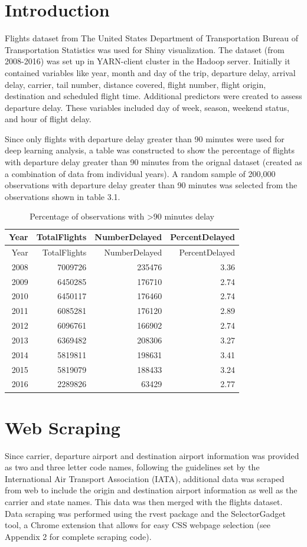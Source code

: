 \documentclass[12pt,twoside]{amherstthesis}
\begin{document}
  \section{Introduction}\label{introduction-1}
  
  Flights dataset from The United States Department of Transportation
  Bureau of Transportation Statistics was used for Shiny visualization.
  The dataset (from 2008-2016) was set up in YARN-client cluster in the
  Hadoop server. Initially it contained variables like year, month and day
  of the trip, departure delay, arrival delay, carrier, tail number,
  distance covered, flight number, flight origin, destination and
  scheduled flight time. Additional predictors were created to assess
  departure delay. These variables included day of week, season, weekend
  status, and hour of flight delay.
  
  Since only flights with departure delay greater than 90 minutes were
  used for deep learning analysis, a table was constructed to show the
  percentage of flights with departure delay greater than 90 minutes from
  the orignal dataset (created as a combination of data from individual
  years). A random sample of 200,000 observations with departure delay
  greater than 90 minutes was selected from the observations shown in
  table 3.1.
  
  \begin{longtable}[]{@{}rrrr@{}}
  \caption{Percentage of observations with \textgreater{}90 minutes
  delay}\tabularnewline
  \toprule
  Year & TotalFlights & NumberDelayed & PercentDelayed\tabularnewline
  \midrule
  \endfirsthead
  \toprule
  Year & TotalFlights & NumberDelayed & PercentDelayed\tabularnewline
  \midrule
  \endhead
  2008 & 7009726 & 235476 & 3.36\tabularnewline
  2009 & 6450285 & 176710 & 2.74\tabularnewline
  2010 & 6450117 & 176460 & 2.74\tabularnewline
  2011 & 6085281 & 176120 & 2.89\tabularnewline
  2012 & 6096761 & 166902 & 2.74\tabularnewline
  2013 & 6369482 & 208306 & 3.27\tabularnewline
  2014 & 5819811 & 198631 & 3.41\tabularnewline
  2015 & 5819079 & 188433 & 3.24\tabularnewline
  2016 & 2289826 & 63429 & 2.77\tabularnewline
  \bottomrule
  \end{longtable}
  
  \section{Web Scraping}\label{web-scraping}
  
  Since carrier, departure airport and destination airport information was
  provided as two and three letter code names, following the guidelines
  set by the International Air Transport Association (IATA), additional
  data was scraped from web to include the origin and destination airport
  information as well as the carrier and state names. This data was then
  merged with the flights dataset. Data scraping was performed using the
  rvest package and the SelectorGadget tool, a Chrome extension that
  allows for easy CSS webpage selection (see Appendix 2 for complete
  scraping code).
  
\end{document}
